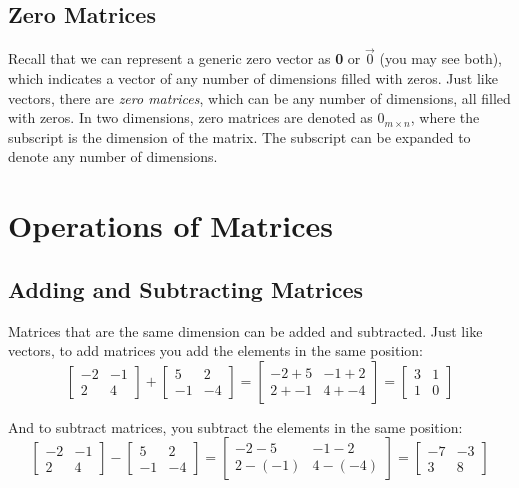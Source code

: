 \subsection{Zero Matrices}
Recall that we can represent a generic zero vector as \textbf{0} or $\vec{0}$ (you may see both), which
indicates a vector of any number of dimensions filled with zeros. Just like
vectors, there are \textit{zero matrices}, which can be any number of dimensions, all filled with zeros. 
In two dimensions, zero matrices are denoted as $\mathbf{\mathit{0}}_{m \times n}$, where the
subscript is the dimension of the matrix. The subscript can be expanded to
denote any number of dimensions.

\section{Operations of Matrices}
\subsection{Adding and Subtracting Matrices}
Matrices that are the same dimension can be added and subtracted. Just like
vectors, to add matrices you add the elements in the same position:
$$\begin{bmatrix}
-2 & -1\\
2 & 4
\end{bmatrix}
+ \begin{bmatrix}
5 & 2\\
-1 & -4
\end{bmatrix}
= \begin{bmatrix}
-2 + 5 & -1 + 2\\
2 + -1 & 4 + -4
\end{bmatrix} =
\begin{bmatrix}
3 & 1\\
1 & 0
\end{bmatrix}$$

And to subtract matrices, you subtract the elements in the same position:
$$\begin{bmatrix}
-2 & -1\\
2 & 4
\end{bmatrix}
- \begin{bmatrix}
5 & 2\\
-1 & -4
\end{bmatrix}
= \begin{bmatrix}
-2 - 5 & -1 - 2\\
2 - (-1) & 4 - (-4)
\end{bmatrix} =
\begin{bmatrix}
-7 & -3\\
3 & 8
\end{bmatrix}$$

